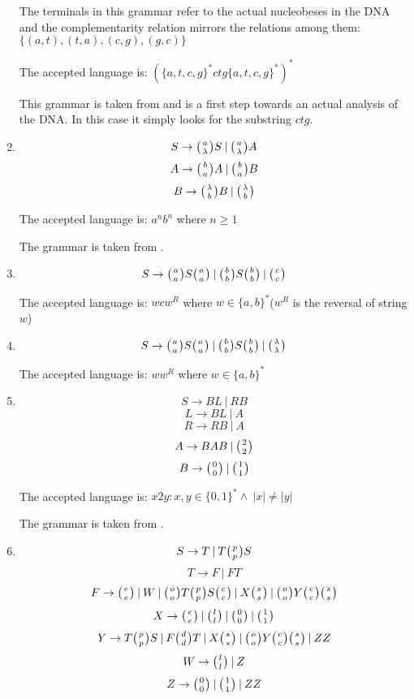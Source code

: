 \begin{enumerate}
{    The terminals in this grammar refer to the actual nucleobeses in the DNA and the complementarity relation mirrors the relations among them: $\{(a, t), (t, a), (c, g), (g, c)\}$

    The accepted language is: $(\{a,t,c,g\}^*ctg\{a,t,c,g\}^*)^*$

    This grammar is taken from \cite{WK_GRAMMARS_1} and is a first step towards an actual analysis of the DNA. In this case it simply looks for the substring $ctg$.
  }

  \item{
    $$S \rightarrow \wkpair{a}{\lambda} S \:|\: \wkpair{a}{\lambda} A$$
    $$A \rightarrow \wkpair{b}{a} A \:|\: \wkpair{b}{a} B$$
    $$B \rightarrow \wkpair{\lambda}{b} B \:|\: \wkpair{\lambda}{b}$$


    The accepted language is: $a^nb^n$ where $n \geq 1$

    The grammar is taken from \cite{REG_GRAMMAR}.
  }

  \item{
    $$S \rightarrow \wkpair{a}{a} S \wkpair{a}{a} \:|\: \wkpair{b}{b} S \wkpair{b}{b} \:|\: \wkpair{c}{c}$$

    The accepted language is: $wcw^R$ where $w \in \{a, b\}^*$($w^R$ is the reversal of string $w$)
  }

  \item{
    $$S \rightarrow \wkpair{a}{a} S \wkpair{a}{a} \:|\: \wkpair{b}{b} S \wkpair{b}{b} \:|\: \wkpair{\lambda}{\lambda}$$

    The accepted language is: $ww^R$ where $w \in \{a, b\}^*$
  }

  \item{
    $$S \rightarrow B L \:|\: R B$$
    $$L \rightarrow B L \:|\: A$$
    $$R \rightarrow R B \:|\: A$$
    $$A \rightarrow B A B \:|\: \wkpair{2}{2}$$
    $$B \rightarrow \wkpair{0}{0} \:|\: \wkpair{1}{1}$$

    The accepted language is: $x2y: x, y \in \{0,1\}^* \wedge \:|x| \neq |y|$

    The grammar is taken from \cite{GRAMMAR_9}.
  }

  \item{
    $$S \rightarrow T \:|\: T \wkpair{p}{p} S$$
    $$T \rightarrow F \:|\: F T$$
    $$F \rightarrow \wkpair{e}{e} \:|\: W \:|\: \wkpair{o}{o} T \wkpair{p}{p} S \wkpair{c}{c} \:|\: X \wkpair{s}{s} \:|\: \wkpair{o}{o} Y \wkpair{c}{c} \wkpair{s}{s}$$
    $$X \rightarrow \wkpair{e}{e} \:|\: \wkpair{l}{l} \:|\: \wkpair{0}{0} \:|\: \wkpair{1}{1}$$
    $$Y \rightarrow T \wkpair{p}{p} S \:|\: F \wkpair{d}{d} T \:|\: X \wkpair{s}{s} \:|\: \wkpair{o}{o} Y \wkpair{c}{c} \wkpair{s}{s} \:|\: Z Z$$
    $$W \rightarrow \wkpair{l}{l} \:|\: Z$$
    $$Z \rightarrow \wkpair{0}{0} \:|\: \wkpair{1}{1} \:|\: Z Z$$

}
\end{enumerate}
